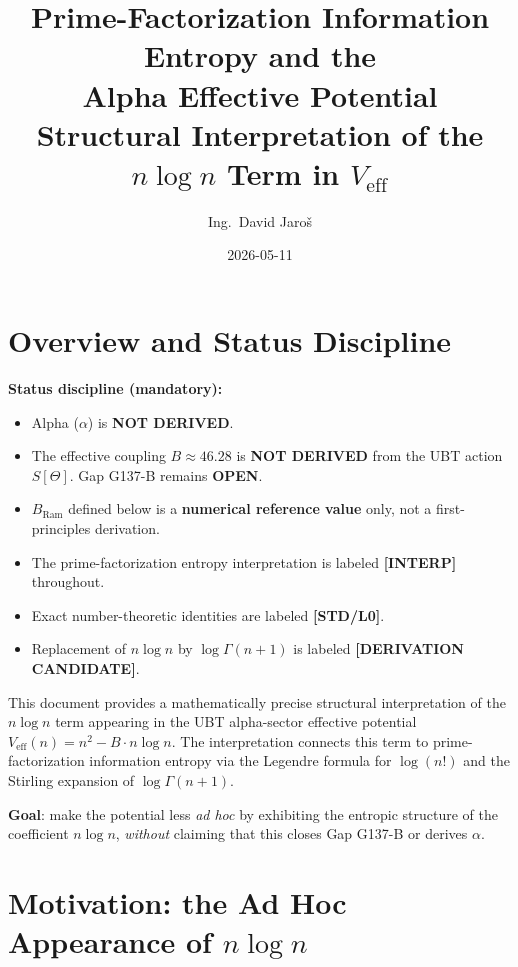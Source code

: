 \documentclass[12pt,a4paper]{article}
\title{\textbf{Prime-Factorization Information Entropy and the\\
         Alpha Effective Potential}\\
         \large Structural Interpretation of the $n\log n$ Term in $V_{\mathrm{eff}}$}
\author{Ing.\ David Jaro\v{s}}
\date{2026-05-11}
\theoremstyle{definition}
\theoremstyle{remark}
\newcommand{\Veff}{V_{\mathrm{eff}}}
\newcommand{\STDLZ}{\textcolor{gray!70!black}{\textbf{[STD/L0]}}}
\newcommand{\INTERP}{\textcolor{blue!60!black}{\textbf{[INTERP]}}}
\newcommand{\DERIVCAND}{\textcolor{orange!80!black}{\textbf{[DERIVATION CANDIDATE]}}}
\begin{document}
  \maketitle
  \tableofcontents
  \newpage
\fi

\section{Overview and Status Discipline}
\label{sec:overview}

\begin{warnbox}
\textbf{Status discipline (mandatory):}
\begin{itemize}
  \item Alpha ($\alpha$) is \textbf{NOT DERIVED}.
  \item The effective coupling $B \approx 46.28$ is \textbf{NOT DERIVED} from the UBT
        action $S[\Theta]$. Gap G137-B remains \textbf{OPEN}.
  \item $B_{\mathrm{Ram}}$ defined below is a \textbf{numerical reference value} only,
        not a first-principles derivation.
  \item The prime-factorization entropy interpretation is labeled \INTERP{} throughout.
  \item Exact number-theoretic identities are labeled \STDLZ{}.
  \item Replacement of $n\log n$ by $\log\Gamma(n+1)$ is labeled \DERIVCAND{}.
\end{itemize}
\end{warnbox}

This document provides a mathematically precise structural interpretation of the
$n\log n$ term appearing in the UBT alpha-sector effective potential
$\Veff(n) = n^2 - B\cdot n\log n$.
The interpretation connects this term to prime-factorization information entropy
via the Legendre formula for $\log(n!)$ and the Stirling expansion of $\log\Gamma(n+1)$.

\textbf{Goal}: make the potential less \emph{ad hoc} by exhibiting the entropic
structure of the coefficient $n\log n$, \emph{without} claiming that this closes
Gap G137-B or derives $\alpha$.

\section{Motivation: the Ad Hoc Appearance of $n\log n$}
\label{sec:motivation}
\end{document}

